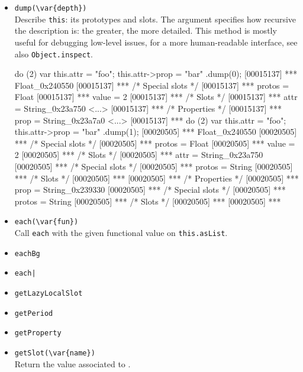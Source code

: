 \begin{itemize}
\item \lstinline|dump(\var{depth})|\\
  Describe \lstinline|this|: its prototypes and slots.  The argument
   specifies how recursive the description is: the greater,
  the more detailed.  This method is mostly useful for debugging
  low-level issues, for a more human-readable interface, see also
  \lstinline|Object.inspect|.
\begin{urbiscript}[firstnumber=last]
do (2) { var this.attr = "foo"; this.attr->prop = "bar" }.dump(0);
[00015137] *** Float_0x240550 {
[00015137] ***   /* Special slots */
[00015137] ***   protos = Float
[00015137] ***   value = 2
[00015137] ***   /* Slots */
[00015137] ***   attr = String_0x23a750 <...>
[00015137] ***     /* Properties */
[00015137] ***     prop = String_0x23a7a0 <...>
[00015137] ***   }
do (2) { var this.attr = "foo"; this.attr->prop = "bar" }.dump(1);
[00020505] *** Float_0x240550 {
[00020505] ***   /* Special slots */
[00020505] ***   protos = Float
[00020505] ***   value = 2
[00020505] ***   /* Slots */
[00020505] ***   attr = String_0x23a750 {
[00020505] ***     /* Special slots */
[00020505] ***     protos = String
[00020505] ***     /* Slots */
[00020505] ***     }
[00020505] ***     /* Properties */
[00020505] ***     prop = String_0x239330 {
[00020505] ***       /* Special slots */
[00020505] ***       protos = String
[00020505] ***       /* Slots */
[00020505] ***       }
[00020505] ***   }
\end{urbiscript}

\item \lstinline|each(\var{fun})|\\
  Call \lstinline|each| with the given functional value on
  \lstinline|this.asList|.

\item \lstinline|eachBg|\\

\item \lstinline$each|$\\

\item \lstinline|getLazyLocalSlot|\\

\item \lstinline|getPeriod|\\

\item \lstinline|getProperty|\\

\item \lstinline|getSlot(\var{name})|\\
  Return the value associated to .


\end{itemize}
